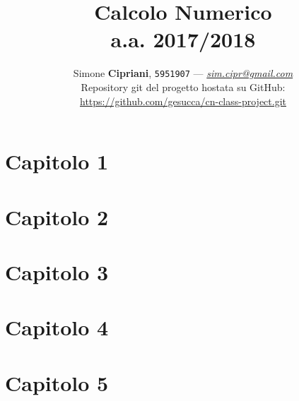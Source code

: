 \documentclass[a4paper, 12pt]{article}
\date{}
\begin{document}
\title{
	\vspace{3cm}
	\textbf{Calcolo Numerico}
	\\
	a.a. 2017/2018
	\vspace{1.5cm}
}

\author{
	Simone \textbf{Cipriani}, \texttt{5951907} --- \href{mailto:sim.cipr@gmail.com}{\textit{sim.cipr@gmail.com}}
	\vspace{1cm}
	\\
	Repository git del progetto hostata su GitHub:
	\\
	\url{https://github.com/gesucca/cn-class-project.git}
}

\maketitle
\newpage
\tableofcontents


\newpage
\section{\textbf{Capitolo 1}}


\newpage
\section{\textbf{Capitolo 2}}


\newpage
\section{\textbf{Capitolo 3}}


\newpage
\section{\textbf{Capitolo 4}}


\newpage
\section{\textbf{Capitolo 5}}

\end{document}
